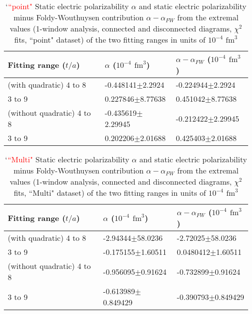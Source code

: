 \begin{table}[H]
\begin{center}
    \begin{tabular}{ | p{4.6cm}  | p{4cm} | p{4cm} | }
    \hline
     Fitting range ($t/a$) & $\alpha$ ($10^{-4}$ $\text{fm}^3$)    & $\alpha-\alpha_{FW}$ ($10^{-4}$ $\text{fm}^3$)       \\ 
     \hline
        (with quadratic) 4 to 8&    -0.448141$\pm$2.2924        &     -0.224944$\pm$2.2924           \\ \hline
     3 to 9 &   0.227846$\pm$8.77638         &      0.451042$\pm$8.77638           \\ \hline\hline
 (without quadratic) 4 to 8 &    -0.435619$\pm$2.29945        &     -0.212422$\pm$2.29945           \\ \hline
     3 to 9 &    0.202206$\pm$2.01688         &      0.425403$\pm$2.01688           \\ \hline
    \end{tabular}
\end{center}
\caption{`\textcolor{red}{``point"} Static electric polarizability  $\alpha$ and static electric polarizability minus Foldy-Wouthuysen contribution $\alpha-\alpha_{FW}$ from the extremal values (1-window analysis, connected and disconnected diagrams, $\chi^2$ fits, ``point" dataset) of the two fitting ranges in units of $10^{-4}$ $\text{fm}^3$}
\label{tab:1wElectricPolarizabilityAllPoint}
\end{table}
\begin{table}[H]
\begin{center}
    \begin{tabular}{ | p{4.6cm}  | p{4cm} | p{4cm} | }
    \hline
     Fitting range ($t/a$) & $\alpha$ ($10^{-4}$ $\text{fm}^3$)    & $\alpha-\alpha_{FW}$ ($10^{-4}$ $\text{fm}^3$)       \\ 
     \hline
        (with quadratic) 4 to 8&    -2.94344$\pm$58.0236        &     -2.72025$\pm$58.0236           \\ \hline
     3 to 9 &   -0.175155$\pm$1.60511         &      0.0480412$\pm$1.60511           \\ \hline\hline
 (without quadratic) 4 to 8 &    -0.956095$\pm$0.91624        &     -0.732899$\pm$0.91624           \\ \hline
     3 to 9 &    -0.613989$\pm$0.849429         &      -0.390793$\pm$0.849429           \\ \hline
    \end{tabular}
\end{center}
\caption{`\textcolor{red}{``Multi"} Static electric polarizability  $\alpha$ and static electric polarizability minus Foldy-Wouthuysen contribution $\alpha-\alpha_{FW}$ from the extremal values (1-window analysis, connected and disconnected diagrams, $\chi^2$ fits, ``Multi" dataset) of the two fitting ranges in units of $10^{-4}$ $\text{fm}^3$}
\label{tab:1wElectricPolarizabilityAllMulti}
\end{table}

